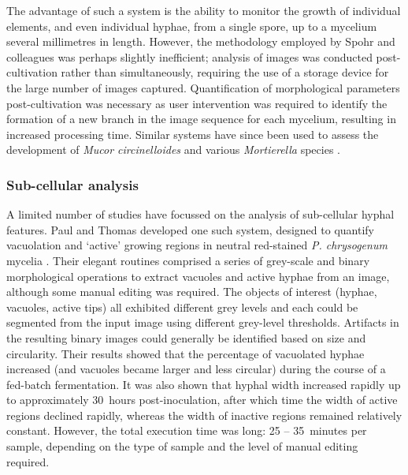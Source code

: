 The advantage of such a system is the ability to monitor the growth of individual elements, and even individual hyphae, from a single spore, up to a mycelium several millimetres in length. However, the methodology employed by Spohr and colleagues was perhaps slightly inefficient; analysis of images was conducted post-cultivation rather than simultaneously, requiring the use of a storage device for the large number of images captured. Quantification of morphological parameters post-cultivation was necessary as user intervention was required to identify the formation of a new branch in the image sequence for each mycelium, resulting in increased processing time. Similar systems have since been used to assess the development of \emph{Mucor circinelloides} \cite{lubbehusen2003,lubbehusen2004} and various \emph{Mortierella} species \cite{eypark2002,eypark2006}.


\subsubsection{Sub-cellular analysis}

A limited number of studies have focussed on the analysis of sub-cellular hyphal features. Paul and Thomas developed one such system, designed to quantify vacuolation and \lq active' growing regions in neutral red-stained \emph{P. chrysogenum} mycelia \cite{paul1998}. Their elegant routines comprised a series of grey-scale and binary morphological operations to extract vacuoles and active hyphae from an image, although some manual editing was required. The objects of interest (hyphae, vacuoles, active tips) all exhibited different grey levels and each could be segmented from the input image using different grey-level thresholds. Artifacts in the resulting binary images could generally be identified based on size and circularity. Their results showed that the percentage of vacuolated hyphae increased (and vacuoles became larger and less circular) during the course of a fed-batch fermentation. It was also shown that hyphal width increased rapidly up to approximately 30~hours post-inoculation, after which time the width of active regions declined rapidly, whereas the width of inactive regions remained relatively constant. However, the total execution time was long: 25 -- 35~minutes per sample, depending on the type of sample and the level of manual editing required.

